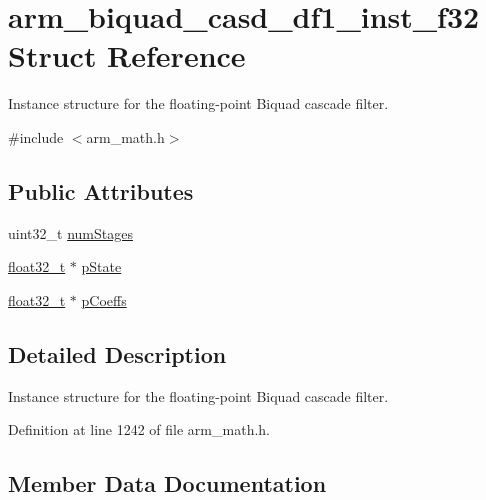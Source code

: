 \hypertarget{structarm__biquad__casd__df1__inst__f32}{}\section{arm\+\_\+biquad\+\_\+casd\+\_\+df1\+\_\+inst\+\_\+f32 Struct Reference}
\label{structarm__biquad__casd__df1__inst__f32}


Instance structure for the floating-\/point Biquad cascade filter.  




{\ttfamily \#include $<$arm\+\_\+math.\+h$>$}

\subsection*{Public Attributes}
\begin{DoxyCompactItemize}
\item 
uint32\+\_\+t \hyperlink{structarm__biquad__casd__df1__inst__f32_af69820c37a87252c46453e4cfe120585}{num\+Stages}
\item 
\hyperlink{arm__math_8h_a4611b605e45ab401f02cab15c5e38715}{float32\+\_\+t} $\ast$ \hyperlink{structarm__biquad__casd__df1__inst__f32_a8c245d79e0d8cfabc82409d4b54fb682}{p\+State}
\item 
\hyperlink{arm__math_8h_a4611b605e45ab401f02cab15c5e38715}{float32\+\_\+t} $\ast$ \hyperlink{structarm__biquad__casd__df1__inst__f32_af9df3820576fb921809d1462c9c6d16c}{p\+Coeffs}
\end{DoxyCompactItemize}


\subsection{Detailed Description}
Instance structure for the floating-\/point Biquad cascade filter. 

Definition at line 1242 of file arm\+\_\+math.\+h.



\subsection{Member Data Documentation}
\mbox{\label{structarm__biquad__casd__df1__inst__f32_af69820c37a87252c46453e4cfe120585}} 
